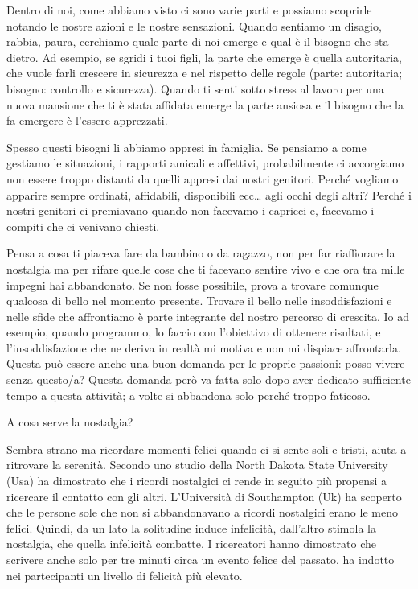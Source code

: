 \documentclass[12pt]{book} %
\begin{document}
Dentro di noi, come abbiamo visto ci sono varie parti e possiamo scoprirle notando le nostre azioni e le nostre
sensazioni. Quando sentiamo un disagio, rabbia, paura, cerchiamo quale parte di noi emerge e qual è il bisogno che sta
dietro. Ad esempio, se sgridi i tuoi figli, la parte che emerge è quella autoritaria, che vuole farli crescere in
sicurezza e nel rispetto delle regole (parte: autoritaria; bisogno: controllo e sicurezza). Quando ti senti sotto
stress al lavoro per una nuova mansione che ti è stata affidata emerge la parte ansiosa e il bisogno che la fa emergere
è l'essere apprezzati.

Spesso questi bisogni li abbiamo appresi in famiglia. Se pensiamo a come gestiamo le situazioni, i rapporti amicali e
affettivi, probabilmente ci accorgiamo non essere troppo distanti da quelli appresi dai nostri genitori. Perché
vogliamo apparire sempre ordinati, affidabili, disponibili ecc… agli occhi degli altri? Perché i nostri genitori ci
premiavano quando non facevamo i capricci e, facevamo i compiti che ci venivano chiesti. 

Pensa a cosa ti piaceva fare da bambino o da ragazzo, non per far riaffiorare la nostalgia ma per rifare quelle cose che
ti facevano sentire vivo e che ora tra mille impegni hai abbandonato. Se non fosse possibile, prova a trovare comunque
qualcosa di bello nel momento presente. Trovare il bello nelle insoddisfazioni e nelle sfide che affrontiamo è parte
integrante del nostro percorso di crescita. Io ad esempio, quando programmo, lo faccio con l'obiettivo di ottenere
risultati, e l'insoddisfazione che ne deriva in realtà mi motiva e non mi dispiace affrontarla. Questa può essere anche
una buon domanda per le proprie passioni: posso vivere senza questo/a? Questa domanda però va fatta solo dopo aver
dedicato sufficiente tempo a questa attività; a volte si abbandona solo perché troppo faticoso.

\begin{mdframed}[linewidth=1pt]
A cosa serve la nostalgia?

Sembra strano ma ricordare momenti felici quando ci si sente soli e tristi, aiuta a ritrovare la serenità. Secondo uno
studio della North Dakota State University (Usa) ha dimostrato che i ricordi nostalgici ci rende in seguito più
propensi a ricercare il contatto con gli altri. L'Università di Southampton (Uk) ha scoperto che le persone sole che
non si abbandonavano a ricordi nostalgici erano le meno felici. Quindi, da un lato la solitudine induce infelicità,
dall'altro stimola la nostalgia, che quella infelicità combatte. I ricercatori hanno dimostrato che scrivere anche solo
per tre minuti circa un evento felice del passato, ha indotto nei partecipanti un livello di felicità più elevato.
\end{mdframed}
\end{document}
